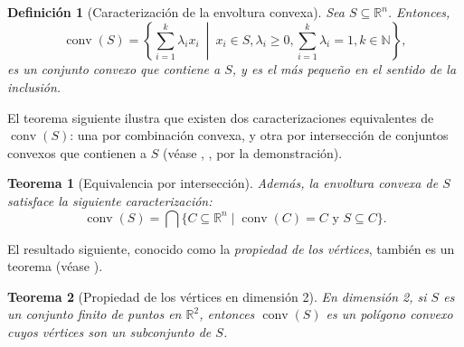 \documentclass[12pt]{book}
\newtheorem{theorem}{Teorema}
\newtheorem{definition}{Definición}
\DeclareMathOperator{\envolt}{\mathrm{conv}}
\theoremstyle{definition}
\theoremstyle{plain}
\theoremstyle{remark}
\begin{document}
\begin{definition}[Caracterización de la envoltura convexa]
Sea \( S \subseteq \mathbb{R}^n \). Entonces,
\[
\envolt(S) = \left\{ \sum_{i=1}^k \lambda_i x_i \ \middle|\ x_i \in S, \lambda_i \geq 0, \sum_{i=1}^k \lambda_i = 1, k \in \mathbb{N} \right\},
\]
es un conjunto convexo que contiene a \( S \), y es el más pequeño en el sentido de la inclusión.
\end{definition}

El teorema siguiente ilustra %
que existen dos caracterizaciones equivalentes de \( \envolt(S) \): una por combinación convexa, y otra por intersección de conjuntos convexos que contienen a \( S \) (véase
\cite{BoydVandenberghe2004}, 
\cite{hiriart2001}, \cite{Rockafellar1970} por la demonstraci\'on).


\begin{theorem}[Equivalencia por intersección]
Además, la envoltura convexa de \( S \) satisface la siguiente caracterización:
\[
\envolt(S) = \bigcap \{ C \subseteq \mathbb{R}^n \mid \envolt(C) = C \text{ y } S \subseteq C \}.
\]
\end{theorem}

El resultado siguiente, conocido como la \emph{propiedad de los vértices}, también es un teorema (véase \cite{Grünbaum1963}).

\begin{theorem}[Propiedad de los vértices en dimensión 2]
En dimensión 2, si \( S \) es un conjunto finito de puntos en \( \mathbb{R}^2 \), entonces \( \envolt(S) \) es un polígono convexo cuyos vértices son un subconjunto de \( S \). %
\end{theorem}



\end{document}
